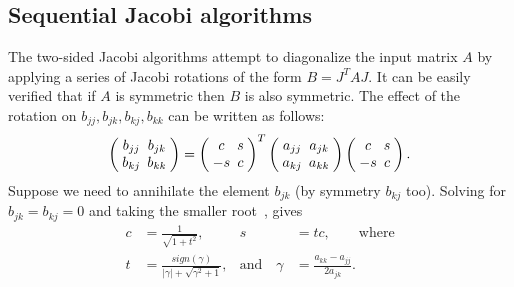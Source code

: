 \documentclass[10pt, conference, compsocconf]{IEEEtran}
\begin{document}
\subsection{Sequential Jacobi algorithms}
\label{sec:seqalgo}

The two-sided Jacobi algorithms attempt to diagonalize the input matrix $A$ by applying a series of Jacobi rotations of the form $B {=} J^T A J$. It can be easily verified that if $A$ is symmetric then $B$ is also symmetric. The effect of the rotation on $b_{jj}, b_{jk}, b_{kj}, b_{kk}$ can be written as follows:
\begin{align}
\setlength{\arraycolsep}{2.5pt}
  \left(\begin{array}{cc}
    b_{jj} & b_{jk} \\
    b_{kj} & b_{kk}
  \end{array} \right)
  =
  \left(\begin{array}{cc}
    c & s \\
    -s & c
  \end{array} \right)^T
  \left(\begin{array}{cc}
    a_{jj} & a_{jk} \\
    a_{kj} & a_{kk}
  \end{array} \right)
  \left(\begin{array}{cc}
    c & s \\
    -s & c
  \end{array} \right). \nonumber
\end{align}
Suppose we need to annihilate the element $b_{jk}$ (by symmetry $b_{kj}$ too). Solving for $b_{jk} {=} b_{kj} {=} 0$ and taking the smaller root~\cite{golub2012matrix}, gives 
\begin{align}
  c &= \frac{1}{\sqrt{1+t^2}}, & s&=tc, \qquad \text{where} \nonumber \\
  t &= \frac{sign(\gamma)}{|\gamma|+\sqrt{\gamma^2+1}}, & \text{and} \quad \gamma &{=} \frac{a_{kk} {-} a_{jj}}{2a_{jk}}. \nonumber
\end{align}
\end{document}
